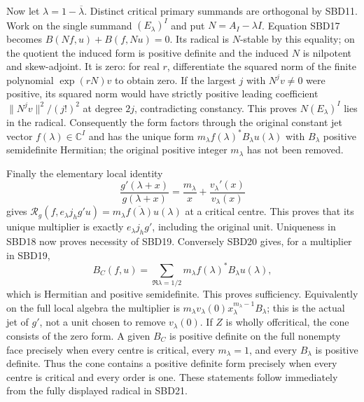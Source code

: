 Now let $\lambda=1-\overline\lambda$. Distinct critical
primary summands are orthogonal by SBD11. Work on the single
summand $(E_\lambda)^I$ and put $N=A_I-\lambda I$.
Equation SBD17 becomes $B(Nf,u)+B(f,Nu)=0$.
Its radical is $N$-stable by this equality; on the quotient
the induced form is positive definite and the induced $N$
is nilpotent and skew-adjoint. It is zero: for real $r$,
differentiate the squared norm of the finite polynomial
$\exp(rN)v$ to obtain zero. If the largest $j$ with
$N^jv\ne0$ were positive, its squared norm would have
strictly positive leading coefficient
$\|N^jv\|^2/(j!)^2$ at degree $2j$, contradicting
constancy. This proves $N(E_\lambda)^I$ lies in the radical.
Consequently the form factors through the original constant
jet vector $f(\lambda)\in\mathbb C^I$ and has the unique form
$m_\lambda f(\lambda)^*B_\lambda u(\lambda)$ with
$B_\lambda$ positive semidefinite Hermitian; the original
positive integer $m_\lambda$ has not been removed.

Finally the elementary local identity
\[
 \frac{g'(\lambda+x)}{g(\lambda+x)}
        =\frac{m_\lambda}{x}+\frac{v_\lambda'(x)}{v_\lambda(x)}
 \tag{SBD20}
\]
gives
$\mathcal R_g(f,e_\lambda j_hg' u)
=m_\lambda\overline{f(\lambda)}u(\lambda)$ at a critical
centre. This proves that its unique multiplier is exactly
$e_\lambda j_hg'$, including the original unit. Uniqueness
in SBD18 now proves necessity of SBD19. Conversely SBD20
gives, for a multiplier in SBD19,
\[
 B_C(f,u)=\sum_{\Re\lambda=1/2}
          m_\lambda f(\lambda)^*B_\lambda u(\lambda),
 \tag{SBD21}
\]
which is Hermitian and positive semidefinite. This proves
sufficiency. Equivalently on the full local algebra the
multiplier is $m_\lambda v_\lambda(0)x_\lambda^{m_\lambda-1}
B_\lambda$; this is the actual jet of $g'$, not a unit
chosen to remove $v_\lambda(0)$. If $Z$ is wholly offcritical,
the cone consists of the zero form. A given $B_C$ is positive
definite on the full nonempty face precisely when every centre
is critical, every $m_\lambda=1$, and every $B_\lambda$ is
positive definite. Thus the cone contains a positive definite
form precisely when every centre is critical and every order
is one. These statements follow immediately from the fully
displayed radical in SBD21.

